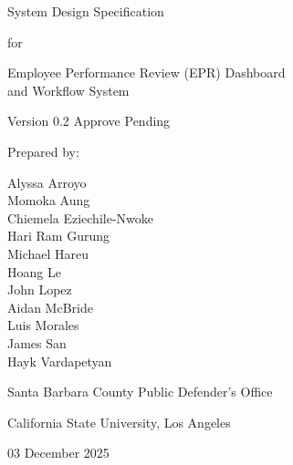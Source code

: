 \documentclass[12pt]{article}
\def\textbf#1{#1}%
\begin{document}

\begin{titlepage}
\centering
\vspace*{3cm}

{\LARGE \textbf{System Design Specification}\par}
\vspace{1.5cm}

{\large for\par}
\vspace{1cm}

{\LARGE \textbf{Employee Performance Review (EPR) Dashboard}\\
\LARGE \textbf{and Workflow System}\par}
\vspace{1.5cm}

{\normalsize Version 0.2 Approve Pending\par}
\vspace{2cm}

{\normalsize Prepared by:\par}
\vspace{0.8cm}
{\normalsize
Alyssa Arroyo\\
Momoka Aung\\
Chiemela Eziechile-Nwoke\\
Hari Ram Gurung\\
Michael Hareu\\
Hoang Le\\
John Lopez\\
Aidan McBride\\
Luis Morales\\
James San\\
Hayk Vardapetyan\par}
\vspace{2cm}

{\normalsize Santa Barbara County Public Defender’s Office\par}
{\normalsize California State University, Los Angeles\par}

\vfill
{\normalsize 03 December 2025\par}

\end{titlepage}

\begingroup
\singlespacing
\setlength{\parskip}{0pt}
\setlength{\parindent}{0pt}
\tableofcontents
\endgroup
\end{document}
